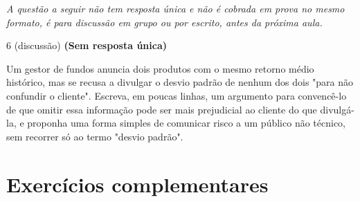 \documentclass[11pt]{article}
\begin{document}
\bigskip
\noindent\textit{A questão a seguir não tem resposta única e não é cobrada em prova no mesmo
formato, é para discussão em grupo ou por escrito, antes da próxima aula.}

\begin{questao}{6 (discussão)} \textbf{(Sem resposta única)}

Um gestor de fundos anuncia dois produtos com o mesmo retorno médio histórico, mas se recusa a
divulgar o desvio padrão de nenhum dos dois "para não confundir o cliente". Escreva, em poucas
linhas, um argumento para convencê-lo de que omitir essa informação pode ser mais prejudicial ao
cliente do que divulgá-la, e proponha uma forma simples de comunicar risco a um público
não técnico, sem recorrer só ao termo "desvio padrão".
\end{questao}


\bigskip
\section*{Exercícios complementares}
\end{document}
